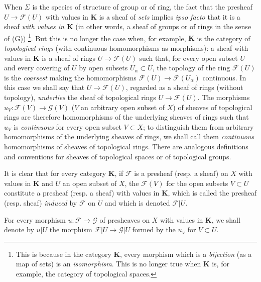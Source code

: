 \begin{env}[3.1.4]
\label{0.3.1.4}
When $\Sigma$ is the species of structure of group or of ring, the fact that
the presheaf $U\to\mathcal{F}(U)$ with values in $\boldsymbol{K}$ is a
sheaf of \emph{sets} implies \emph{ipso facto} that it is a
sheaf \emph{with values in $\boldsymbol{K}$} (in other words, a sheaf of
groups or of rings in the sense of (G))%
\footnote{This is because in the category $\boldsymbol{K}$, every morphism
which is a \emph{bijection} (as a map of sets) is an
\emph{isomorphism}. This is no longer true when $\boldsymbol{K}$ is, for example, the
category of topological spaces.}. But this is no longer the
case when, for example, $\boldsymbol{K}$ is the category of \emph{topological
rings} (with continuous homomorphisms as morphisms): a
sheaf with values in $\boldsymbol{K}$ is a sheaf of rings
$U\to\mathcal{F}(U)$ such that, for every open subset $U$ and every covering of $U$
by open subsets $U_\alpha\subset U$, the topology of the ring $\mathcal{F}(U)$
is the \emph{coarsest} making the homomorphisms
$\mathcal{F}(U)\to\mathcal{F}(U_\alpha)$ continuous. In this case we shall say that
$U\to\mathcal{F}(U)$, regarded as a sheaf of rings (without topology),
\emph{underlies} the sheaf of topological rings
$U\to\mathcal{F}(U)$. The morphisms
$u_V:\mathcal{F}(V)\to\mathcal{G}(V)$ ($V$ an arbitrary open subset of $X$) of
sheaves of topological rings are therefore homomorphisms of the underlying sheaves
of rings such that $u_V$ is \emph{continuous} for every open subset
$V\subset X$; to distinguish them from arbitrary homomorphisms of the
underlying sheaves of rings, we shall call them \emph{continuous}
homomorphisms of sheaves of topological rings. There are analogous definitions and
conventions for sheaves of topological spaces or of topological
groups.
\end{env}


\begin{env}[3.1.5]
\label{0.3.1.5}
It is clear that for every category $\boldsymbol{K}$, if $\mathcal{F}$ is a
presheaf (resp. a sheaf) on $X$ with values in $\boldsymbol{K}$ and $U$ an
open subset of $X$, the $\mathcal{F}(V)$ for the open subsets $V\subset U$ constitute
a presheaf (resp. a sheaf) with values in $\boldsymbol{K}$, which is
called the presheaf (resp. sheaf) \emph{induced} by $\mathcal{F}$ on $U$ and
which is denoted $\mathcal{F}|U$.

For every morphism $u:\mathcal{F}\to\mathcal{G}$ of presheaves on $X$ with
values in $\boldsymbol{K}$, we shall denote by $u|U$ the morphism
$\mathcal{F}|U\to\mathcal{G}|U$ formed by the $u_V$ for $V\subset U$.
\end{env}

